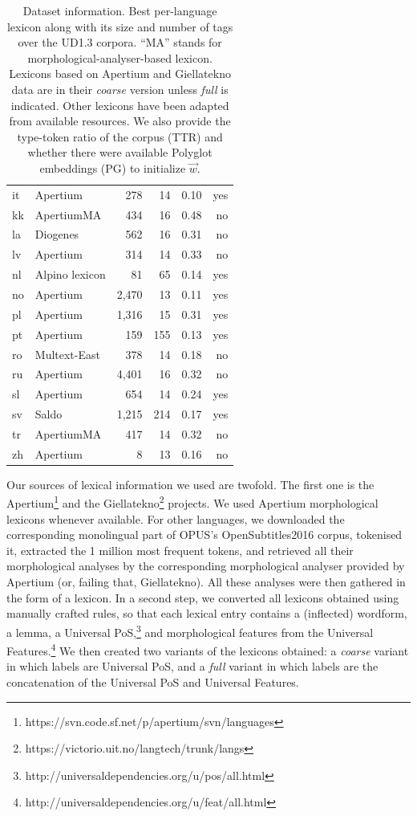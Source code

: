 \documentclass[11pt,a4paper]{article}
\begin{document}
\begin{table}[t]
\begin{tabular}{llrr|rr}
it & Apertium & 278 &14 &  0.10 & yes\\
kk & ApertiumMA& 434 & 16 &  0.48 & no\\
la  & Diogenes & 562 & 16 &  0.31 &no\\
lv & Apertium & 314 & 14  &  0.33& no \\
nl &  Alpino lexicon  & 81 & 65 &  0.14&yes\\
no & Apertium & 2,470 & 13 &  0.11 & yes\\
pl & Apertium & 1,316 &  15 &  0.31 & yes\\
pt & Apertium & 159 & 155 &  0.13 & yes\\
ro &  Multext-East  & 378 & 14 &  0.18 & no \\
ru & Apertium & 4,401 &16&  0.32 & no  \\
sl & Apertium & 654 & 14 &  0.24 &yes\\
sv & Saldo & 1,215 & 214 &  0.17 & yes\\
tr & ApertiumMA & 417 & 14 &  0.32  &no \\
zh & Apertium & 8 & 13 &  0.16 & no \\
\bottomrule
\end{tabular}
\caption{Dataset information. Best per-language lexicon along with its size and number of tags over the UD1.3
  corpora. ``MA'' stands for morphological-analyser-based lexicon. Lexicons based on Apertium and Giellatekno
  data are in their {\em coarse} version unless {\em full} is indicated. Other lexicons
  have been adapted from available resources.\footnotemark{} We also provide the type-token ratio of the 
  corpus (TTR) and whether there were available Polyglot embeddings (PG) to initialize $\vec{w}$.}\label{tbl:lex}
\end{table}

Our sources of lexical information we used are twofold. The first one is the
Apertium\footnote{https://svn.code.sf.net/p/apertium/svn/languages} and the
Giellatekno\footnote{https://victorio.uit.no/langtech/trunk/langs} projects. We used Apertium morphological lexicons
whenever available. For other languages, we downloaded the corresponding monolingual part of OPUS's OpenSubtitles2016
corpus, tokenised it, extracted the 1 million most frequent tokens, and retrieved all their morphological analyses by
the corresponding morphological analyser provided by Apertium (or, failing that, Giellatekno). All these analyses were
then gathered in the form of a lexicon. In a second step, we converted all lexicons obtained using manually crafted
rules, so that each lexical entry contains a (inflected) wordform, a lemma, a Universal
PoS,\footnote{http://universaldependencies.org/u/pos/all.html} and morphological features from the Universal
Features.\footnote{http://universaldependencies.org/u/feat/all.html} We then created two variants of the lexicons
obtained: a {\em coarse} variant in which labels are Universal PoS, and a {\em full} variant in which labels are the
concatenation of the Universal PoS and Universal Features.
\end{document}
